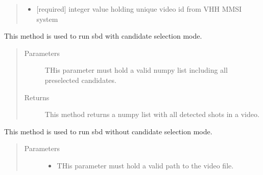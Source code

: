 \documentclass[letterpaper,10pt,english,openany,oneside]{sphinxmanual}
\begin{document}
\begin{fulllineitems}
\begin{fulllineitems}
\begin{quote}
\begin{description}
\begin{itemize}
\item {} 
 \textendash{} {[}required{]} integer value holding unique video id from VHH MMSI system

\end{itemize}

\end{description}\end{quote}

\end{fulllineitems}


\begin{fulllineitems}
\label{\detokenize{SBD:sbd.SBD.SBD.runWithCandidateSelection}}
This method is used to run sbd with candidate selection mode.
\begin{quote}\begin{description}
\item[{Parameters}] \leavevmode
{} \textendash{} THis parameter must hold a valid numpy list including all pre\sphinxhyphen{}selected candidates.

\item[{Returns}] \leavevmode
This method returns a numpy list with all detected shots in a video.

\end{description}\end{quote}

\end{fulllineitems}


\begin{fulllineitems}
\label{\detokenize{SBD:sbd.SBD.SBD.runWithoutCandidateSelection}}
This method is used to run sbd without candidate selection mode.
\begin{quote}\begin{description}
\item[{Parameters}] \leavevmode\begin{itemize}
\item {} 
 \textendash{} THis parameter must hold a valid path to the video file.


\end{itemize}
\end{description}
\end{quote}
\end{fulllineitems}
\end{fulllineitems}
\end{document}
